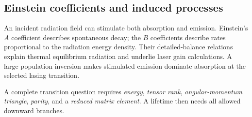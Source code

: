 \subsection{Einstein coefficients and induced processes}
An incident radiation field can
stimulate both absorption and emission.
Einstein's \(A\) coefficient describes
spontaneous decay; the \(B\) coefficients
describe rates proportional to the
radiation energy density.
Their detailed-balance relations explain
thermal equilibrium radiation and
underlie laser gain calculations.
A large population inversion makes
stimulated emission dominate absorption
at the selected lasing transition.

\begin{checkpoint}
A complete transition question requires
\emph{energy}, \emph{tensor rank},
\emph{angular-momentum triangle},
\emph{parity}, and a \emph{reduced
matrix element}. A lifetime then needs
all allowed downward branches.
\end{checkpoint}
